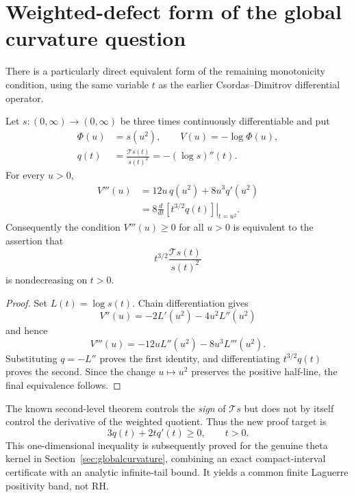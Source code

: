 \section{Weighted-defect form of the global curvature question}
\label{sec:weightedcurvature}
There is a particularly direct equivalent form of the
remaining monotonicity condition, using the same variable
$t$ as the earlier Csordas--Dimitrov differential operator.

\begin{proposition}
Let $s:(0,\infty)\to(0,\infty)$ be three times
continuously differentiable and put
\begin{align*}
\Phi(u)&=s(u^2),\qquad V(u)=-\log\Phi(u),\\
q(t)&=\frac{\mathcal Ts(t)}{s(t)^2}
=-(\log s)''(t).
\end{align*}
For every $u>0$,
\begin{align}
V'''(u)&=12u\,q(u^2)+8u^3q'(u^2)\nonumber\\
&=8\left.\frac{d}{dt}
[t^{3/2}q(t)]\right|_{t=u^2}.
\label{eq:weightedeq}
\end{align}
Consequently
the condition $V'''(u)\ge0$ for all $u>0$ is
equivalent to the assertion that
\[
t^{3/2}\frac{\mathcal Ts(t)}{s(t)^2}
\]
is nondecreasing on $t>0$.
\end{proposition}
\begin{proof}
Set $L(t)=\log s(t)$. Chain differentiation
gives
\[
V''(u)=-2L'(u^2)-4u^2L''(u^2)
\]
and hence
\[
V'''(u)=-12uL''(u^2)-8u^3L'''(u^2).
\]
Substituting $q=-L''$ proves the first identity,
and differentiating $t^{3/2}q(t)$ proves
the second. Since the change $u\mapsto u^2$
preserves the positive half-line, the final
equivalence follows.
\end{proof}

The known second-level theorem controls the
\emph{sign} of $\mathcal Ts$ but does not by
itself control the derivative of the weighted
quotient. Thus the new proof target is
\[
3q(t)+2tq'(t)\ge0,\qquad t>0.
\]
This one-dimensional inequality is subsequently proved
for the genuine theta kernel in
Section~\ref{sec:globalcurvature}, combining an exact
compact-interval certificate with an analytic infinite-tail
bound. It yields a common finite Laguerre positivity band,
not RH.
